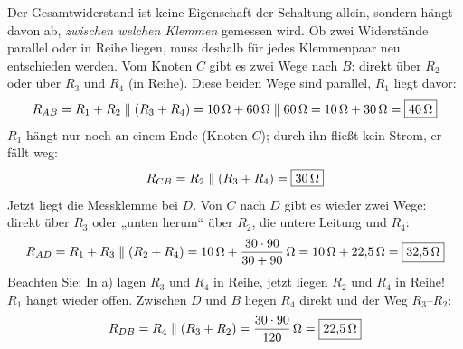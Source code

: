 \documentclass[11pt,a4paper]{article}
\begin{document}
\begin{loesung}
Der Gesamtwiderstand ist keine Eigenschaft der Schaltung allein, sondern hängt davon ab, \emph{zwischen welchen Klemmen} gemessen wird. Ob zwei Widerstände parallel oder in Reihe liegen, muss deshalb für jedes Klemmenpaar neu entschieden werden.
Vom Knoten $C$ gibt es zwei Wege nach $B$: direkt über $R_2$ oder über $R_3$ und $R_4$ (in Reihe). Diese beiden Wege sind parallel, $R_1$ liegt davor:
\[ R_{AB} = R_1 + R_2\parallel(R_3+R_4) = \SI{10}{\ohm} + \SI{60}{\ohm}\parallel\SI{60}{\ohm} = \SI{10}{\ohm}+\SI{30}{\ohm} = \boxed{\SI{40}{\ohm}} \]
$R_1$ hängt nur noch an einem Ende (Knoten $C$); durch ihn fließt kein Strom, er fällt weg:
\[ R_{CB} = R_2\parallel(R_3+R_4) = \boxed{\SI{30}{\ohm}} \]
Jetzt liegt die Messklemme bei $D$. Von $C$ nach $D$ gibt es wieder zwei Wege: direkt über $R_3$ oder „unten herum“ über $R_2$, die untere Leitung und $R_4$:
\[ R_{AD} = R_1 + R_3\parallel(R_2+R_4) = \SI{10}{\ohm} + \frac{30\cdot 90}{30+90}\,\si{\ohm} = \SI{10}{\ohm}+\SI{22.5}{\ohm} = \boxed{\SI{32.5}{\ohm}} \]
Beachten Sie: In a) lagen $R_3$ und $R_4$ in Reihe, jetzt liegen $R_2$ und $R_4$ in Reihe!
$R_1$ hängt wieder offen. Zwischen $D$ und $B$ liegen $R_4$ direkt und der Weg $R_3$--$R_2$:
\[ R_{DB} = R_4\parallel(R_3+R_2) = \frac{30\cdot 90}{120}\,\si{\ohm} = \boxed{\SI{22.5}{\ohm}} \]
\end{loesung}
\end{document}
